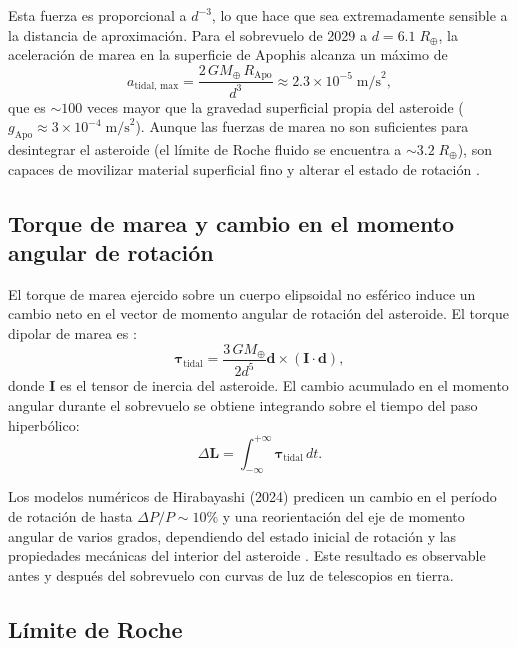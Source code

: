 \documentclass[a4paper]{article}
\begin{document}
Esta fuerza es proporcional a $d^{-3}$, lo que hace que sea extremadamente sensible a la distancia de aproximación. Para el sobrevuelo de 2029 a $d = 6.1\;R_\oplus$, la aceleración de marea en la superficie de Apophis alcanza un máximo de
\begin{equation}
  a_\text{tidal, max} = \frac{2\,GM_\oplus\, R_\text{Apo}}{d^3} \approx 2.3\times10^{-5}\;\text{m/s}^2,
\end{equation}
que es $\sim 100$ veces mayor que la gravedad superficial propia del asteroide ($g_\text{Apo} \approx 3 \times 10^{-4}\;\text{m/s}^2$). Aunque las fuerzas de marea no son suficientes para desintegrar el asteroide (el límite de Roche fluido se encuentra a $\sim 3.2\;R_\oplus$), son capaces de movilizar material superficial fino y alterar el estado de rotación \cite{kim2023tidal, hirabayashi2024prediction}.

\subsection{Torque de marea y cambio en el momento angular de rotación}

El torque de marea ejercido sobre un cuerpo elipsoidal no esférico induce un cambio neto en el vector de momento angular de rotación del asteroide. El torque dipolar de marea es \cite{hirabayashi2024prediction}:
\begin{equation}
  \boldsymbol{\tau}_\text{tidal} = \frac{3\,GM_\oplus}{2d^5}\mathbf{d}\times(\mathbf{I}\cdot\mathbf{d}),
\end{equation}
donde $\mathbf{I}$ es el tensor de inercia del asteroide. El cambio acumulado en el momento angular durante el sobrevuelo se obtiene integrando sobre el tiempo del paso hiperbólico:
\begin{equation}
  \Delta \mathbf{L} = \int_{-\infty}^{+\infty} \boldsymbol{\tau}_\text{tidal}\,dt.
\end{equation}

Los modelos numéricos de Hirabayashi (2024) predicen un cambio en el período de rotación de hasta $\Delta P / P \sim 10\%$ y una reorientación del eje de momento angular de varios grados, dependiendo del estado inicial de rotación y las propiedades mecánicas del interior del asteroide \cite{hirabayashi2024prediction}. Este resultado es observable antes y después del sobrevuelo con curvas de luz de telescopios en tierra.

\subsection{Límite de Roche}
\end{document}
